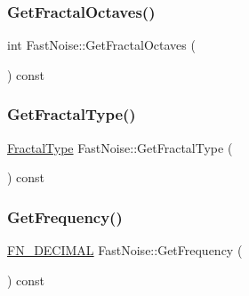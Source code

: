 \subsubsection{\texorpdfstring{Get\+Fractal\+Octaves()}{GetFractalOctaves()}}
{\footnotesize\ttfamily int Fast\+Noise\+::\+Get\+Fractal\+Octaves (\begin{DoxyParamCaption}{ }\end{DoxyParamCaption}) const\hspace{0.3cm}{\ttfamily [inline]}}

\mbox{\label{class_fast_noise_ad65fd4033ae2177be857fc186e9d6315}} 
\subsubsection{\texorpdfstring{Get\+Fractal\+Type()}{GetFractalType()}}
{\footnotesize\ttfamily \mbox{\hyperlink{class_fast_noise_a20a2d45a468fa10a7c6a94e22c2f3d30}{Fractal\+Type}} Fast\+Noise\+::\+Get\+Fractal\+Type (\begin{DoxyParamCaption}{ }\end{DoxyParamCaption}) const\hspace{0.3cm}{\ttfamily [inline]}}

\mbox{\label{class_fast_noise_a102aa79881c39779145806dcd48f1a9a}} 
\subsubsection{\texorpdfstring{Get\+Frequency()}{GetFrequency()}}
{\footnotesize\ttfamily \mbox{\hyperlink{_fast_noise_8h_a75a9ef6d2541c4921815b885bfd449c3}{F\+N\+\_\+\+D\+E\+C\+I\+M\+AL}} Fast\+Noise\+::\+Get\+Frequency (\begin{DoxyParamCaption}{ }\end{DoxyParamCaption}) const\hspace{0.3cm}{\ttfamily [inline]}}

\mbox{\label{class_fast_noise_a5a7d929f828f01ccf740de9198aaed3c}} 
